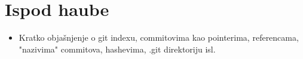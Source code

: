 \chapter*{Ispod haube}

\begin{itemize}
   \item Kratko objašnjenje o git indexu, commitovima kao pointerima, referencama, "nazivima" commitova, hashevima, .git direktoriju isl.
\end{itemize}


